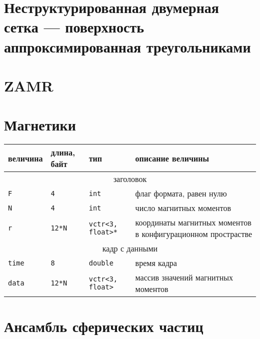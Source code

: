 \documentclass[12pt]{article}
\begin{document}
\section{Неструктурированная двумерная сетка --- поверхность аппроксимированная треугольниками}
\section{ZAMR}
\section{Магнетики}
\begin{center}
\begin{tabular}{|p{}|p{}|p{}|p{}|}
\hline
величина & длина, байт & тип & описание величины \\
\hline
\multicolumn{4}{|c|}{заголовок \rule{0pt}{.6cm}}\\
\hline
{\tt F} & {\tt 4} & {\tt int} & флаг формата, равен нулю \\
{\tt N} & {\tt 4} & {\tt int} & число магнитных моментов \\
{\tt r} & {\tt 12*N} & {\tt vctr<3, float>*} & координаты магнитных моментов в конфигурационном прострастве\\
\hline
\multicolumn{4}{|c|}{кадр с данными \rule{0pt}{.6cm}}\\
\hline
{\tt time} & {\tt 8} & {\tt double} & время кадра \\
{\tt data} & {\tt 12*N} & {\tt vctr<3, float>} & массив значений магнитных моментов \\
\hline
\end{tabular}
\end{center}

\section{Ансамбль сферических частиц}
\end{document}
